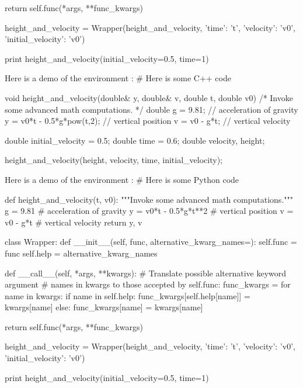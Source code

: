         return self.func(*args, **func_kwargs)

height_and_velocity = Wrapper(height_and_velocity,
                              {'time': 't',
                               'velocity': 'v0',
                               'initial_velocity': 'v0'})

print height_and_velocity(initial_velocity=0.5, time=1)


\noindent
Here is a demo of the environment :
# Here is some C++ code

void height_and_velocity(double& y, double& v,
                         double t, double v0)
{
    /*
    Invoke some advanced math computations.
    */
    double g = 9.81;               // acceleration of gravity
    y = v0*t - 0.5*g*pow(t,2);     // vertical position
    v = v0 - g*t;                  // vertical velocity
}

double initial_velocity = 0.5;
double time = 0.6;
double velocity, height;

height_and_velocity(height, velocity, time, initial_velocity);

\noindent
Here is a demo of the environment :
# Here is some Python code

def height_and_velocity(t, v0):
    """Invoke some advanced math computations."""
    g = 9.81                  # acceleration of gravity
    y = v0*t - 0.5*g*t**2     # vertical position
    v = v0 - g*t              # vertical velocity
    return y, v

class Wrapper:
    def __init__(self, func, alternative_kwarg_names={}):
        self.func = func
        self.help = alternative_kwarg_names

    def __call__(self, *args, **kwargs):
        # Translate possible alternative keyword argument
        # names in kwargs to those accepted by self.func:
        func_kwargs = {}
        for name in kwargs:
            if name in self.help:
                func_kwargs[self.help[name]] = kwargs[name]
            else:
                func_kwargs[name] = kwargs[name]

        return self.func(*args, **func_kwargs)

height_and_velocity = Wrapper(height_and_velocity,
                              {'time': 't',
                               'velocity': 'v0',
                               'initial_velocity': 'v0'})

print height_and_velocity(initial_velocity=0.5, time=1)


